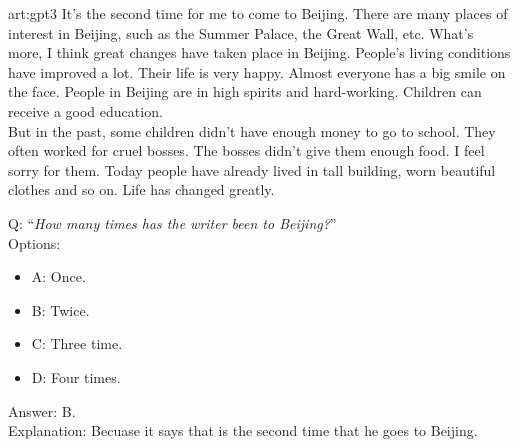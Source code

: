 \begin{passage}{art:gpt3}
 It's the second time for me to come to Beijing. There are many places of interest in Beijing, such as the Summer Palace, the Great Wall, etc. What's more, I think great changes have taken place in Beijing. People's living conditions have improved a lot. Their life is very happy. Almost everyone has a big smile on the face. People in Beijing are in high spirits and hard-working. Children can receive a good education. \\
But in the past, some children didn't have enough money to go to school. They often worked for cruel bosses. The bosses didn't give them enough food. I feel sorry for them. Today people have already lived in tall building, worn beautiful clothes and so on. Life has changed greatly.
\end{passage}
Q: ``\emph{How many times has the writer been to Beijing?}''\\
Options: 
\begin{itemize}
 \item A: Once.
 \item B: Twice.
 \item C: Three time.
 \item D: Four times.
\end{itemize}
Answer: B. \\
Explanation: Becuase it says that is the second time that he goes to Beijing.

